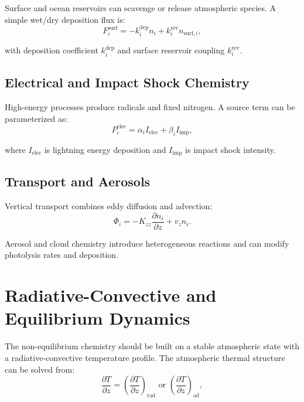\documentclass[11pt]{article}
\begin{document}
Surface and ocean reservoirs can scavenge or release atmospheric species. A simple wet/dry deposition flux is:
\begin{equation}
F_i^{\mathrm{surf}} = -k_i^{\mathrm{dep}} n_i + k_i^{\mathrm{rev}} n_{\mathrm{surf},i},
\end{equation}

with deposition coefficient $k_i^{\mathrm{dep}}$ and surface reservoir coupling $k_i^{\mathrm{rev}}$.

\subsection{Electrical and Impact Shock Chemistry}

High-energy processes produce radicals and fixed nitrogen. A source term can be parameterized as:
\begin{equation}
P_i^{\mathrm{elec}} = \alpha_i I_{\mathrm{elec}} + \beta_i I_{\mathrm{imp}},
\end{equation}

where $I_{\mathrm{elec}}$ is lightning energy deposition and $I_{\mathrm{imp}}$ is impact shock intensity.

\subsection{Transport and Aerosols}

Vertical transport combines eddy diffusion and advection:
\begin{equation}
\Phi_i = -K_{zz} \frac{\partial n_i}{\partial z} + v_z n_i.
\end{equation}

Aerosol and cloud chemistry introduce heterogeneous reactions and can modify photolysis rates and deposition.

\section{Radiative-Convective and Equilibrium Dynamics}

The non-equilibrium chemistry should be built on a stable atmospheric state with a radiative-convective temperature profile. The atmospheric thermal structure can be solved from:
\begin{equation}
\frac{\partial T}{\partial z} = \left( \frac{\partial T}{\partial z} \right)_{\mathrm{rad}} \text{ or } \left( \frac{\partial T}{\partial z} \right)_{\mathrm{ad}},
\end{equation}
\end{document}
